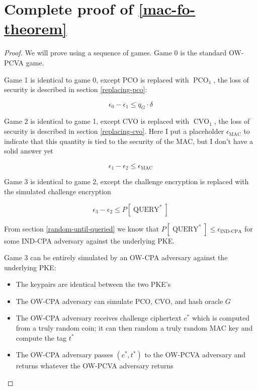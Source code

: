 \documentclass{article}
\begin{document}
\section{Complete proof of \ref{mac-fo-theorem}}\label{proof-of-mac-fo-theorem}
\begin{proof}
    We will prove using a sequence of games. Game 0 is the standard OW-PCVA game.

    Game 1 is identical to game 0, except PCO is replaced with $\operatorname{PCO}_1$, the loss of security is described in section \ref{replacing-pco}:

    \begin{equation*}
        \epsilon_0 - \epsilon_1 \leq q_G \cdot \delta
    \end{equation*}

    Game 2 is identical to game 1, except CVO is replaced with $\operatorname{CVO}_1$, the loss of security is described in section \ref{replacing-cvo}. Here I put a placeholder $\epsilon_\text{MAC}$ to indicate that this quantity is tied to the security of the MAC, but I don't have a solid answer yet

    \begin{equation*}
        \epsilon_1 - \epsilon_2 \leq \epsilon_\text{MAC}
    \end{equation*}

    Game 3 is identical to game 2, except the challenge encryption is replaced with the simulated challenge encryption

    \begin{equation*}
        \epsilon_3 - \epsilon_2 \leq P[\operatorname{QUERY}^\ast]
    \end{equation*}

    From section \ref{random-until-queried} we know that $P[\operatorname{QUERY}^\ast] \leq \epsilon_\text{IND-CPA}$ for some IND-CPA adversary against the underlying PKE.

    Game 3 can be entirely simulated by an OW-CPA adversary against the underlying PKE:

    \begin{itemize}
        \item The keypairs are identical between the two PKE's
        \item The OW-CPA adversary can simulate PCO, CVO, and hash oracle $G$
        \item The OW-CPA adversary receives challenge ciphertext $c^\ast$ which is computed from a truly random coin; it can then random a truly random MAC key and compute the tag $t^\ast$
        \item The OW-CPA adversary passes $(c^\ast, t^\ast)$ to the OW-PCVA adversary and returns whatever the OW-PCVA adversary returns
    \end{itemize}


\end{proof}
\end{document}

